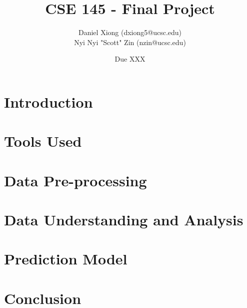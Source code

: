 \documentclass[12pt, notitlepage]{article}
\title{CSE 145 - Final Project}
\author{Daniel Xiong (dxiong5@ucsc.edu)\\
		Nyi Nyi "Scott" Zin (nzin@ucsc.edu)}
\date{Due XXX}
\begin{document}
\maketitle
\section{Introduction}
\section{Tools Used}
\section{Data Pre-processing}
\section{Data Understanding and Analysis}
\section{Prediction Model}
\section{Conclusion}
\end{document}
